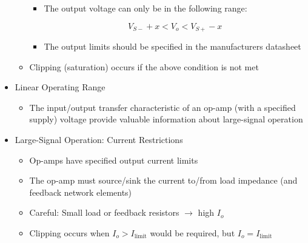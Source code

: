 \begin{itemize}
\begin{itemize}
\begin{itemize}
          \item The output voltage can only be in the following range:

            $$V_{S-}+x<V_o<V_{S+}-x$$

          \item The output limits should be specified in the manufacturers datasheet

        \end{itemize}

      \item Clipping (saturation) occurs if the above condition is not met

    \end{itemize}

  \item Linear Operating Range

    \begin{itemize}

      \item The input/output transfer characteristic of an op-amp (with a specified supply) voltage provide valuable information about large-signal operation

    \end{itemize}

  \item Large-Signal Operation: Current Restrictions

    \begin{itemize}

      \item Op-amps have specified output current limits

      \item The op-amp must source/sink the current to/from load impedance (and feedback network elements)

      \item Careful: Small load or feedback resistors $\to$ high $I_o$


      \item Clipping occurs when $I_o>I_{\text{limit}}$ would be required, but $I_o=I_{\text{limit}}$

    \end{itemize}

\end{itemize}



